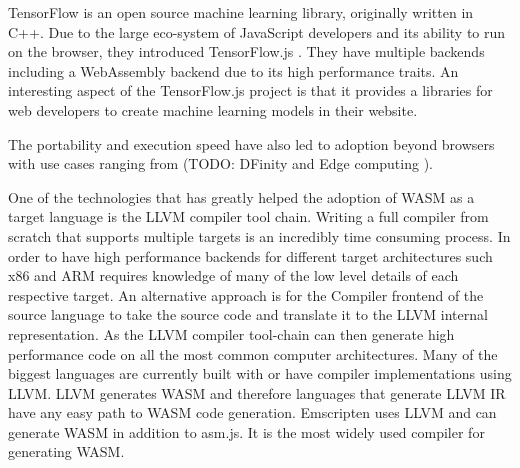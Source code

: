 \documentclass[11pt]{book}
\begin{document}
TensorFlow \cite{tensorflow} is an open source machine learning library, originally written in C++. Due to the large eco-system of JavaScript developers and its ability to run on the browser, they introduced TensorFlow.js \cite{tensorflowjs}. They have multiple backends including a WebAssembly backend due to its high performance traits. An interesting aspect of the TensorFlow.js project is that it provides a libraries for web developers to create machine learning models in their website. 

The portability and execution speed have also led to adoption beyond browsers with use cases ranging from (TODO: DFinity and Edge computing \cite{Fellow_edgecomputing:}).  

    
    


One of the technologies that has greatly helped the adoption of WASM as a target language is the LLVM \cite{llvm} compiler tool chain. Writing a full compiler from scratch that supports multiple targets is an incredibly time consuming process. In order to have high performance backends for different target architectures such x86 and ARM requires knowledge of many of the low level details of each respective target. An alternative approach is for the Compiler frontend of the source language to take the source code and translate it to the LLVM internal representation. As the LLVM compiler tool-chain can then generate high performance code on all the most common computer architectures. Many of the biggest languages are currently built with or have compiler implementations using LLVM.
LLVM generates WASM and therefore languages that generate LLVM IR have any easy path to WASM code generation. 
Emscripten uses LLVM and can generate WASM in addition to asm.js. It is the most widely used compiler for generating WASM.
\end{document}
